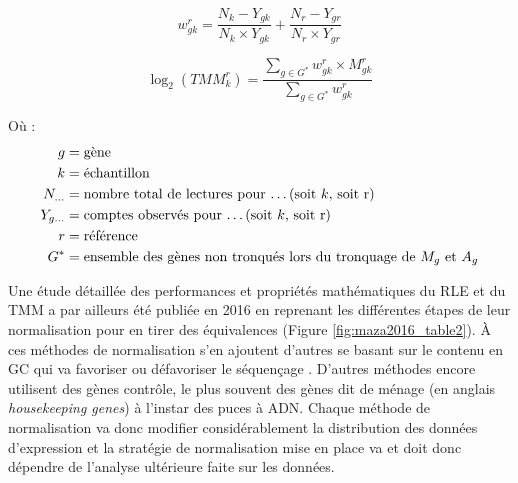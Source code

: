 \begin{equation}\label{weightedmean}
    w^r_{gk} = \frac{N_k - Y_{gk}}{N_k \times Y_{gk}} + \frac{N_r - Y_{gr}}{N_r \times Y_{gr}}
\end{equation}

\begin{equation}\label{normtmmfactor}
    \log_2{} (TMM^r_k) = \frac{\sum_{g \in G^*} w^r_{gk} \times M^r_{gk}}{\sum_{g \in G^*} w^r_{gk}}
\end{equation}

Où :
\begin{align*}
    g & = \text{gène} \\
    k & = \text{échantillon} \\
    N_{\dots} & = \text{nombre total de lectures pour \dots (soit }k \text{, soit r)} \\
    Y_{g\dots} & = \text{comptes observés pour \dots (soit }k \text{, soit r)} \\
    r & = \text{référence} \\
    G^* & = \text{ensemble des gènes non tronqués lors du tronquage de } M_g \text{ et } A_g
\end{align*}


Une étude détaillée des performances et propriétés mathématiques du RLE et du TMM a par ailleurs été publiée en 2016 en reprenant les différentes étapes de leur normalisation pour en tirer des équivalences \cite{Maza2016} (Figure \ref{fig:maza2016_table2}). À ces méthodes de normalisation s'en ajoutent d'autres se basant sur le contenu en GC qui va favoriser ou défavoriser le séquençage \cite{Filloux2014Dec}. D'autres méthodes encore utilisent des gènes contrôle, le plus souvent des gènes dit de ménage (en anglais \textit{housekeeping genes}) \cite{Zhou2017Sep} à l'instar des puces à ADN. Chaque méthode de normalisation va donc modifier considérablement la distribution des données d'expression et la stratégie de normalisation mise en place va et doit donc dépendre de l'analyse ultérieure faite sur les données. 



